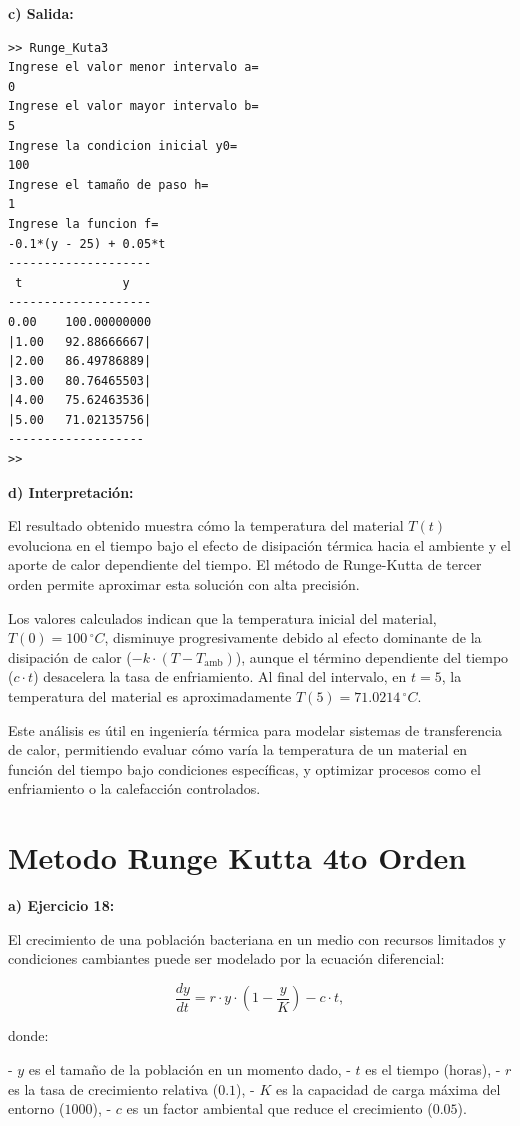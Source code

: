 \documentclass[12pt,a4paper,twoside]{article}  %
\begin{document}
\textbf{c) Salida:}

\begin{verbatim}
>> Runge_Kuta3
Ingrese el valor menor intervalo a=
0
Ingrese el valor mayor intervalo b=
5
Ingrese la condicion inicial y0=
100
Ingrese el tamaño de paso h=
1
Ingrese la funcion f=
-0.1*(y - 25) + 0.05*t
--------------------
 t              y 
--------------------
0.00	100.00000000
|1.00	92.88666667|
|2.00	86.49786889|
|3.00	80.76465503|
|4.00	75.62463536|
|5.00	71.02135756|
-------------------
>> 
\end{verbatim}

\textbf{d) Interpretación:}

El resultado obtenido muestra cómo la temperatura del material \( T(t) \) evoluciona en el tiempo bajo el efecto de disipación térmica hacia el ambiente y el aporte de calor dependiente del tiempo. El método de Runge-Kutta de tercer orden permite aproximar esta solución con alta precisión.

Los valores calculados indican que la temperatura inicial del material, \( T(0) = 100 \,^\circ C \), disminuye progresivamente debido al efecto dominante de la disipación de calor (\(-k \cdot (T - T_{\text{amb}})\)), aunque el término dependiente del tiempo (\(c \cdot t\)) desacelera la tasa de enfriamiento. Al final del intervalo, en \( t = 5 \), la temperatura del material es aproximadamente \( T(5) = 71.0214 \,^\circ C \).

Este análisis es útil en ingeniería térmica para modelar sistemas de transferencia de calor, permitiendo evaluar cómo varía la temperatura de un material en función del tiempo bajo condiciones específicas, y optimizar procesos como el enfriamiento o la calefacción controlados.

\section{Metodo Runge Kutta 4to Orden}


\textbf{a) Ejercicio 18: }

El crecimiento de una población bacteriana en un medio con recursos limitados y condiciones cambiantes puede ser modelado por la ecuación diferencial:

\[
\frac{dy}{dt} = r \cdot y \cdot \left(1 - \frac{y}{K}\right) - c \cdot t,
\]

donde:

- \( y \) es el tamaño de la población en un momento dado,
- \( t \) es el tiempo (horas),
- \( r \) es la tasa de crecimiento relativa (\( 0.1 \)),
- \( K \) es la capacidad de carga máxima del entorno (\( 1000 \)),
- \( c \) es un factor ambiental que reduce el crecimiento (\( 0.05 \)).
\end{document}
